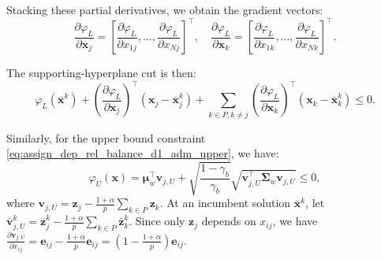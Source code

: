\documentclass[preprint,12pt,authoryear]{elsarticle}
\begin{document}
Stacking these partial derivatives, we obtain the gradient vectors:
\begin{equation}
\frac{\partial \varphi_L}{\partial \mathbf{x}_j} = \left[\frac{\partial \varphi_L}{\partial x_{1j}}, \ldots, \frac{\partial \varphi_L}{\partial x_{Nj}}\right]^\top, \quad \frac{\partial \varphi_L}{\partial \mathbf{x}_k} = \left[\frac{\partial \varphi_L}{\partial x_{1k}}, \ldots, \frac{\partial \varphi_L}{\partial x_{Nk}}\right]^\top.
\label{eq:assign_dep_rel_d1_subgradient_vectors}
\end{equation}

The supporting-hyperplane cut is then:
\begin{equation}
\varphi_L(\bar{\mathbf{x}}^k) + \left(\frac{\partial \varphi_L}{\partial \mathbf{x}_j}\right)^\top (\mathbf{x}_j - \bar{\mathbf{x}}_j^k) + \sum_{k \in P, k \neq j} \left(\frac{\partial \varphi_L}{\partial \mathbf{x}_k}\right)^\top (\mathbf{x}_k - \bar{\mathbf{x}}_k^k) \leqslant 0.
\label{eq:assign_dep_rel_balance_d1_supporting_cut_lower}
\end{equation}

Similarly, for the upper bound constraint \eqref{eq:assign_dep_rel_balance_d1_adm_upper}, we have:
\begin{equation}
\varphi_U(\mathbf{x}) = \boldsymbol{\mu}_w^\top \mathbf{v}_{j,U} + \sqrt{\frac{1-\gamma_b}{\gamma_b}} \sqrt{\mathbf{v}_{j,U}^\top \boldsymbol{\Sigma}_w \mathbf{v}_{j,U}} \leqslant 0,
\label{eq:assign_dep_rel_phi_U}
\end{equation}
where $\mathbf{v}_{j,U} = \mathbf{z}_j - \frac{1+\alpha}{p}\sum_{k \in P} \mathbf{z}_k$. At an incumbent solution $\bar{\mathbf{x}}^k$, let $\bar{\mathbf{v}}_{j,U}^k = \bar{\mathbf{z}}_j^k - \frac{1+\alpha}{p}\sum_{k \in P} \bar{\mathbf{z}}_k^k$. Since only $\mathbf{z}_j$ depends on $x_{ij}$, we have $\frac{\partial \mathbf{v}_{j,U}}{\partial x_{ij}} = \mathbf{e}_{ij} - \frac{1+\alpha}{p}\mathbf{e}_{ij} = \left(1 - \frac{1+\alpha}{p}\right)\mathbf{e}_{ij}$.
\end{document}
